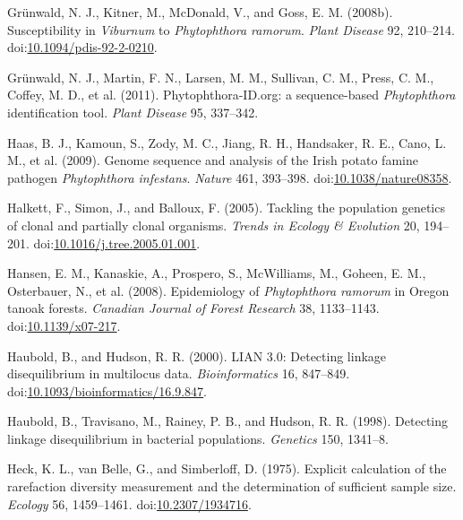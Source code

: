 \documentclass[double,12pt]{beavtex}
\begin{document}
  \hypertarget{ref-grunwald2008susceptibility}{}
  Grünwald, N. J., Kitner, M., McDonald, V., and Goss, E. M. (2008b).
  Susceptibility in \emph{Viburnum} to \emph{Phytophthora ramorum}.
  \emph{Plant Disease} 92, 210--214.
  doi:\href{https://doi.org/10.1094/pdis-92-2-0210}{10.1094/pdis-92-2-0210}.
  
  \hypertarget{ref-grunwald2011phytophthora}{}
  Grünwald, N. J., Martin, F. N., Larsen, M. M., Sullivan, C. M., Press,
  C. M., Coffey, M. D., et al. (2011). Phytophthora-ID.org: a
  sequence-based \emph{Phytophthora} identification tool. \emph{Plant
  Disease} 95, 337--342.
  
  \hypertarget{ref-haas2009genome}{}
  Haas, B. J., Kamoun, S., Zody, M. C., Jiang, R. H., Handsaker, R. E.,
  Cano, L. M., et al. (2009). Genome sequence and analysis of the Irish
  potato famine pathogen \emph{Phytophthora infestans}. \emph{Nature} 461,
  393--398.
  doi:\href{https://doi.org/10.1038/nature08358}{10.1038/nature08358}.
  
  \hypertarget{ref-halkett2005tackling}{}
  Halkett, F., Simon, J., and Balloux, F. (2005). Tackling the population
  genetics of clonal and partially clonal organisms. \emph{Trends in
  Ecology \& Evolution} 20, 194--201.
  doi:\href{https://doi.org/10.1016/j.tree.2005.01.001}{10.1016/j.tree.2005.01.001}.
  
  \hypertarget{ref-hansen2008epidemiology}{}
  Hansen, E. M., Kanaskie, A., Prospero, S., McWilliams, M., Goheen, E.
  M., Osterbauer, N., et al. (2008). Epidemiology of \emph{Phytophthora
  ramorum} in Oregon tanoak forests. \emph{Canadian Journal of Forest
  Research} 38, 1133--1143.
  doi:\href{https://doi.org/10.1139/x07-217}{10.1139/x07-217}.
  
  \hypertarget{ref-haubold2000lian}{}
  Haubold, B., and Hudson, R. R. (2000). LIAN 3.0: Detecting linkage
  disequilibrium in multilocus data. \emph{Bioinformatics} 16, 847--849.
  doi:\href{https://doi.org/10.1093/bioinformatics/16.9.847}{10.1093/bioinformatics/16.9.847}.
  
  \hypertarget{ref-haubold1998detecting}{}
  Haubold, B., Travisano, M., Rainey, P. B., and Hudson, R. R. (1998).
  Detecting linkage disequilibrium in bacterial populations.
  \emph{Genetics} 150, 1341--8.
  
  \hypertarget{ref-heck1975explicit}{}
  Heck, K. L., van Belle, G., and Simberloff, D. (1975). Explicit
  calculation of the rarefaction diversity measurement and the
  determination of sufficient sample size. \emph{Ecology} 56, 1459--1461.
  doi:\href{https://doi.org/10.2307/1934716}{10.2307/1934716}.
  
\end{document}
